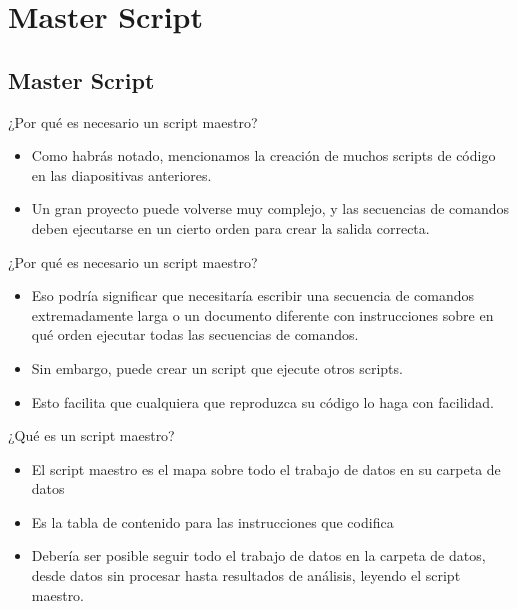 \documentclass[11pt, aspectratio=169, compress]{beamer}
\begin{document}
\section{Master Script}
\subsection{Master Script}
\begin{frame}{¿Por qué es necesario un script maestro?}
	\begin{itemize}
		\item Como habrás notado, mencionamos la creación de muchos scripts de código en las diapositivas anteriores.
		\item Un gran proyecto puede volverse muy complejo, y las secuencias de comandos deben ejecutarse en un cierto orden para crear la salida correcta.
	\end{itemize}
\end{frame}
\begin{frame}{¿Por qué es necesario un script maestro?}
	\begin{itemize}
		\item Eso podría significar que necesitaría escribir una secuencia de comandos extremadamente larga o un documento diferente con instrucciones sobre en qué orden ejecutar todas las secuencias de comandos.
		\item Sin embargo, puede crear un script que ejecute otros scripts.
		\item Esto facilita que cualquiera que reproduzca su código lo haga con facilidad.
	\end{itemize}
\end{frame}
\begin{frame}{¿Qué es un script maestro?}
	\begin{itemize}
		\item El script maestro es el mapa sobre todo el trabajo de datos en su carpeta de datos
		\item Es la tabla de contenido para las instrucciones que codifica
		\item Debería ser posible seguir todo el trabajo de datos en la carpeta de datos, desde datos sin procesar hasta resultados de análisis, leyendo el script maestro. 
	\end{itemize}
\end{frame}
\end{document}
